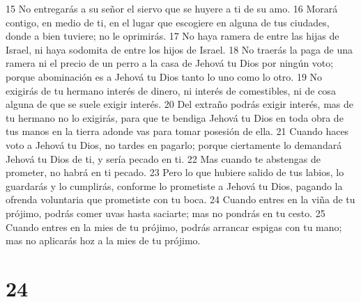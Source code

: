15 No entregarás a su señor el siervo que se huyere a ti de su amo.
16 Morará contigo, en medio de ti, en el lugar que escogiere en alguna de tus ciudades, donde a bien tuviere; no le oprimirás.
17 No haya ramera de entre las hijas de Israel, ni haya sodomita de entre los hijos de Israel.
18 No traerás la paga de una ramera ni el precio de un perro a la casa de Jehová tu Dios por ningún voto; porque abominación es a Jehová tu Dios tanto lo uno como lo otro.
19 No exigirás de tu hermano interés de dinero, ni interés de comestibles, ni de cosa alguna de que se suele exigir interés.
20 Del extraño podrás exigir interés, mas de tu hermano no lo exigirás, para que te bendiga Jehová tu Dios en toda obra de tus manos en la tierra adonde vas para tomar posesión de ella. 
21 Cuando haces voto a Jehová tu Dios, no tardes en pagarlo; porque ciertamente lo demandará Jehová tu Dios de ti, y sería pecado en ti.
22 Mas cuando te abstengas de prometer, no habrá en ti pecado. 
23 Pero lo que hubiere salido de tus labios, lo guardarás y lo cumplirás, conforme lo prometiste a Jehová tu Dios, pagando la ofrenda voluntaria que prometiste con tu boca.
24 Cuando entres en la viña de tu prójimo, podrás comer uvas hasta saciarte; mas no pondrás en tu cesto.
25 Cuando entres en la mies de tu prójimo, podrás arrancar espigas con tu mano; mas no aplicarás hoz a la mies de tu prójimo. 

\chapter{24}



